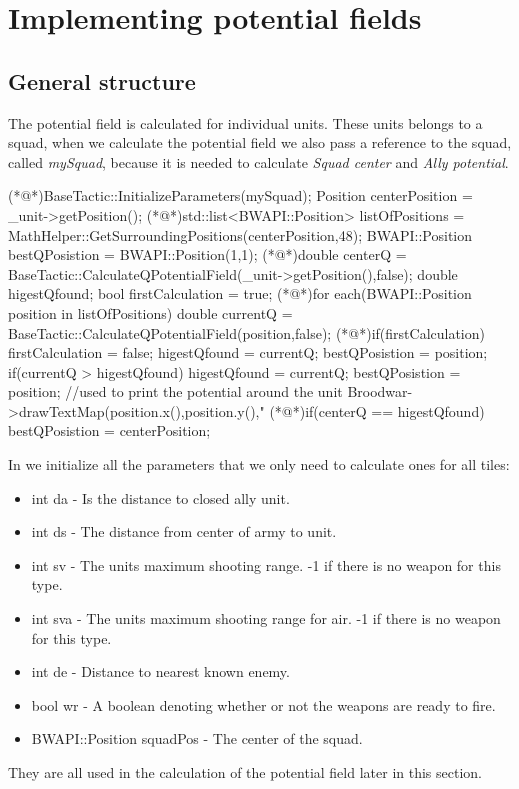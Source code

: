 \section{Implementing potential fields}
	
	\subsection{General structure}
	The potential field is calculated for individual units. These units belongs to a squad, when we calculate the potential field we also pass a reference to the squad, called \textit{mySquad}, because it is needed to calculate \textit{Squad center} and \textit{Ally potential}.

\begin{Sourcecode}[caption=Main loop]	
(*@\lnote@*)BaseTactic::InitializeParameters(mySquad);
Position centerPosition = _unit->getPosition();
(*@\lnote@*)std::list<BWAPI::Position> listOfPositions = MathHelper::GetSurroundingPositions(centerPosition,48);
BWAPI::Position bestQPosistion = BWAPI::Position(1,1);
(*@\lnote@*)double centerQ = BaseTactic::CalculateQPotentialField(_unit->getPosition(),false);
double higestQfound; 
bool firstCalculation = true;
(*@\lnote@*)for each(BWAPI::Position position in listOfPositions)
{
	double currentQ = BaseTactic::CalculateQPotentialField(position,false);
	(*@\lnote@*)if(firstCalculation)
	{
		firstCalculation = false;
		higestQfound = currentQ;
		bestQPosistion = position;
	} 
	if(currentQ > higestQfound)
	{
		higestQfound = currentQ;
		bestQPosistion = position;
	}
	//used to print the potential around the unit
	Broodwar->drawTextMap(position.x(),position.y(),"%
}
(*@\lnote@*)if(centerQ == higestQfound)
{
	bestQPosistion = centerPosition;
}
\end{Sourcecode}	
	In  we initialize all the parameters that we only need to calculate ones for all tiles:
	\begin{itemize}
	    \item int da - Is the distance to closed ally unit.
		\item int ds - The distance from center of army to unit.
		\item int sv - The units maximum shooting range. -1 if there is no weapon for this type.
		\item int sva - The units maximum shooting range for air. -1 if there is no weapon for this type.
		\item int de - Distance to nearest known enemy.
		\item bool wr - A boolean denoting whether or not the weapons are ready to fire.
		\item BWAPI::Position squadPos - The center of the squad.
	\end{itemize}
	They are all used in the calculation of the potential field later in this section.	
	
